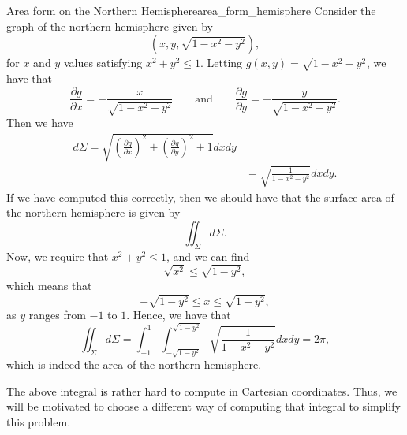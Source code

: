                                     \begin{ex}{Area form on the Northern Hemisphere}{area_form_hemisphere}
                                     	Consider the graph of the northern hemisphere given by
                                     	\[
                                     	(x,y,\sqrt{1-x^2-y^2}),
                                     	\]
                                     	for $x$ and $y$ values satisfying $x^2+y^2\leq 1$.  Letting $g(x,y)=\sqrt{1-x^2-y^2}$, we have that
                                     	\[
                                     	\frac{\partial g}{\partial x} = -\frac{x}{\sqrt{1-x^2-y^2}} \qquad \textrm{and} \qquad \frac{\partial g}{\partial y} = -\frac{y}{\sqrt{1-x^2-y^2}}.
                                     	\]
                                     	Then we have
                                     	\begin{align*}
	                                     	d\Sigma = \sqrt{\left(\frac{\partial g}{\partial x}\right)^2 + \left(\frac{\partial g}{\partial y}\right)^2 + 1 }dxdy\\
	                                     	&=\sqrt{\frac{1}{1-x^2-y^2}}dxdy.
                                     	\end{align*}
                                     	If we have computed this correctly, then we should have that the surface area of the northern hemisphere is given by
                                     	\[
                                     	\iint_\Sigma d\Sigma.
                                     	\]
                                     	Now, we require that $x^2+y^2\leq 1$, and we can find
                                     	\[
                                     	\sqrt{x^2}\leq \sqrt{1-y^2},
                                     	\]
                                     	which means that
                                     	\[
                                     	-\sqrt{1-y^2}\leq x \leq \sqrt{1-y^2},
                                     	\]
                                     	as $y$ ranges from $-1$ to $1$.  Hence, we have that
                                     	\[
                                     	\iint_\Sigma d\Sigma = \int_{-1}^1 \int_{-\sqrt{1-y^2}}^{\sqrt{1-y^2}} \sqrt{\frac{1}{1-x^2-y^2}}dxdy = 2\pi,
                                     	\]
                                     	which is indeed the area of the northern hemisphere.
                                     \end{ex}

                                     \begin{remark}
                                     	The above integral is rather hard to compute in Cartesian coordinates.  Thus, we will be motivated to choose a different way of computing that integral to simplify this problem.
                                     \end{remark}

